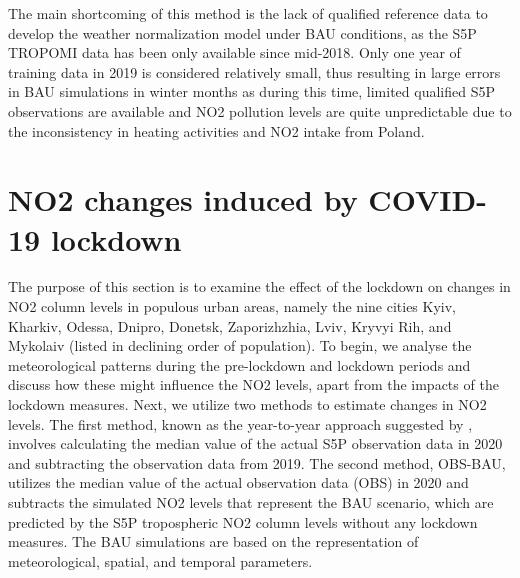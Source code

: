 The main shortcoming of this method is the lack of qualified reference data to develop the weather normalization model under BAU conditions, as the S5P TROPOMI data has been only available since mid-2018. Only one year of training data in 2019 is considered relatively small, thus resulting in large errors in BAU simulations in winter months as during this time, limited qualified S5P observations are available and NO2 pollution levels are quite unpredictable due to the inconsistency in heating activities and NO2 intake from Poland.\par
\section{NO2 changes induced by COVID-19 lockdown} \label{chap3_covid}
The purpose of this section is to examine the effect of the lockdown on changes in NO2 column levels in populous urban areas, namely the nine cities Kyiv, Kharkiv, Odessa, Dnipro, Donetsk, Zaporizhzhia, Lviv, Kryvyi Rih, and Mykolaiv (listed in declining order of population). To begin, we analyse the meteorological patterns during the pre-lockdown and lockdown periods and discuss how these might influence the NO2 levels, apart from the impacts of the lockdown measures. Next, we utilize two methods to estimate changes in NO2 levels. The first method, known as the year-to-year approach suggested by \citep{barre2021estimating}, involves calculating the median value of the actual S5P observation data in 2020 and subtracting the observation data from 2019. The second method, OBS-BAU, utilizes the median value of the actual observation data (OBS) in 2020 and subtracts the simulated NO2 levels that represent the BAU scenario, which are predicted by the S5P tropospheric NO2 column levels without any lockdown measures. The BAU simulations are based on the representation of meteorological, spatial, and temporal parameters. \par
